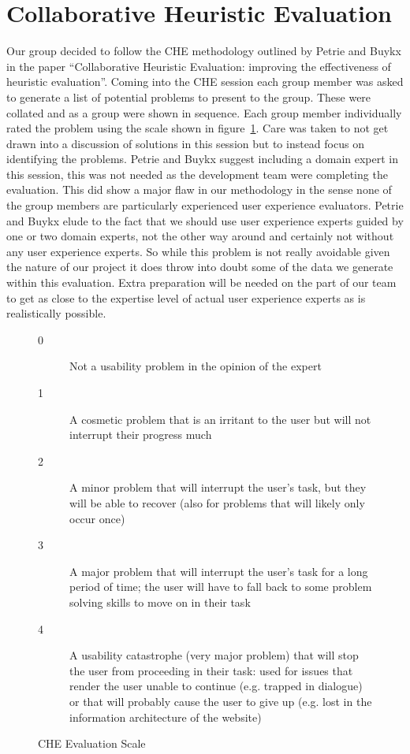 \section{Collaborative Heuristic Evaluation}
Our group decided to follow the CHE methodology outlined by Petrie and Buykx in the paper ``Collaborative Heuristic Evaluation: improving the effectiveness of heuristic evaluation''\cite{buykx2010}. Coming into the CHE session each group member was asked to generate a list of potential problems to present to the group. These were collated and as a group were shown in sequence. Each group member individually rated the problem using the scale shown in figure~\ref{che1}. Care was taken to not get drawn into a discussion of solutions in this session but to instead focus on identifying the problems. Petrie and Buykx suggest including a domain expert in this session, this was not needed as the development team were completing the evaluation. This did show a major flaw in our methodology in the sense none of the group members are particularly experienced user experience evaluators. Petrie and Buykx elude to the fact that we should use user experience experts guided by one or two domain experts, not the other way around and certainly not without any user experience experts. So while this problem is not really avoidable given the nature of our project it does throw into doubt some of the data we generate within this evaluation. Extra preparation will be needed on the part of our team to get as close to the expertise level of actual user experience experts as is realistically possible.


\begin{figure}[htbp]
  \begin{description}
  \item[0] \hspace{2mm} Not a usability problem in the opinion of the expert
  \item[1] \hspace{2mm} A cosmetic problem that is an irritant to the user but will not interrupt their progress much
  \item[2] \hspace{2mm} A minor problem that will interrupt the user's task, but they will be able to recover (also for problems that will likely only occur once)
  \item[3] \hspace{2mm} A major problem that will interrupt the user's task for a long period of time; the user will have to fall back to some problem solving skills to move on in their task
  \item[4] \hspace{2mm} A usability catastrophe (very major problem) that will stop the user from proceeding in their task: used for issues that render the user unable to continue (e.g. trapped in dialogue) or that will probably cause the user to give up (e.g. lost in the information architecture of the website)
  \end{description}
  \caption{CHE Evaluation Scale}
  \label{che1}
\end{figure}


